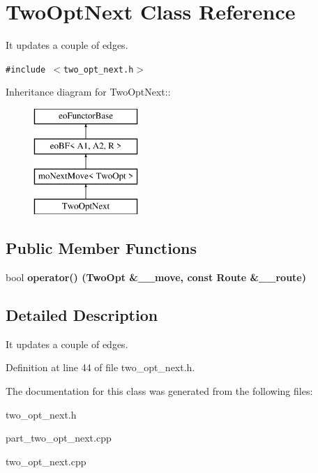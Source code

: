 \section{Two\-Opt\-Next Class Reference}
\label{class_two_opt_next}
It updates a couple of edges.  


{\tt \#include $<$two\_\-opt\_\-next.h$>$}

Inheritance diagram for Two\-Opt\-Next::\begin{figure}[H]
\begin{center}
\leavevmode
\includegraphics[height=4cm]{class_two_opt_next}
\end{center}
\end{figure}
\subsection*{Public Member Functions}
\begin{CompactItemize}
\item 
bool \bf{operator()} (\bf{Two\-Opt} \&\_\-\_\-move, const \bf{Route} \&\_\-\_\-route)\label{class_two_opt_next_baf229b2e056f39ab971cf2ac66a833e}

\end{CompactItemize}


\subsection{Detailed Description}
It updates a couple of edges. 



Definition at line 44 of file two\_\-opt\_\-next.h.

The documentation for this class was generated from the following files:\begin{CompactItemize}
\item 
two\_\-opt\_\-next.h\item 
part\_\-two\_\-opt\_\-next.cpp\item 
two\_\-opt\_\-next.cpp\end{CompactItemize}
